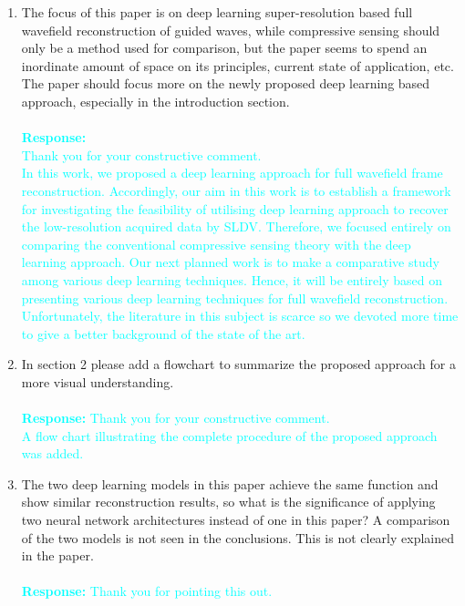 \documentclass[11pt,a2paper]{report}
\begin{document}
	\begin{enumerate}
		\item The focus of this paper is on deep learning super-resolution based full wavefield reconstruction of guided waves, while compressive sensing should only be a method used for comparison, but the paper seems to spend an inordinate amount of space on its principles, current state of application, etc. 
		The paper should focus more on the newly proposed deep learning based approach, especially in the introduction section.
		\\ \\ 
		\textcolor{Cyan}
		{
			\textbf{Response:}\\
			Thank you for your constructive comment. \\
			In this work, we proposed a deep learning approach for full wavefield frame reconstruction.
			Accordingly, our aim in this work is to establish a framework for investigating the feasibility of utilising deep learning approach to recover the low-resolution acquired data by SLDV.			
			Therefore, we focused entirely on comparing the conventional compressive sensing theory with the deep learning approach.
			Our next planned work is to make a comparative study among various deep learning techniques.
			Hence, it will be entirely based on presenting various deep learning techniques for full wavefield reconstruction.
			Unfortunately, the literature in this subject is scarce so we devoted more time to give a better background of the state of the art.
		}
		\item  In section 2 please add a flowchart to summarize the proposed approach for a more visual understanding.
		\\ \\ 
		\textcolor{Cyan}
		{
			\textbf{Response:}
			Thank you for your constructive comment. \\
			A flow chart illustrating the complete procedure of the proposed approach was added.
		}
		\item The two deep learning models in this paper achieve the same function and show similar reconstruction results, so what is the significance of applying two neural network architectures instead of one in this paper? A comparison of the two models is not seen in the conclusions. 
		This is not clearly explained in the paper. 
		\\ \\ 
		\textcolor{Cyan}
		{
			\textbf{Response:}
			Thank you for pointing this out. \\
}
\end{enumerate}
\end{document}
